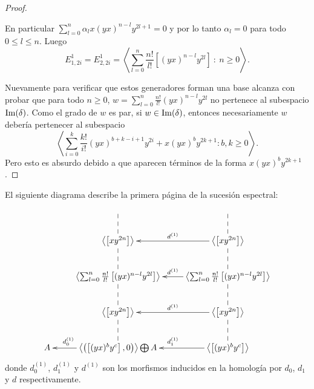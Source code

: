 \documentclass[fleqn,../tesis.tex]{subfiles}
\begin{document}
\begin{proof}
\begin{itemize}
		En particular $\sum_{l = 0}^n\alpha_lx(yx)^{n - l}y^{2l + 1} = 0$ y por lo tanto $\alpha_l = 0$ para todo $0 \leq l \leq n$.
		Luego
		\[
			E_{1,2i}^1 = E_{2, 2i}^1 = \left\langle \sum_{l = 0}^n \frac{n!}{l!}\left[(yx)^{n - l}y^{2l}\right] \ :\ n \geq 0\right\rangle.
		\]
	\end{itemize}
	Nuevamente para verificar que estos generadores forman una base alcanza con probar que para  todo $n \geq 0$,
	$w = \sum_{l = 0}^n \frac{n!}{l!}(yx)^{n - l}y^{2l}$ no pertenece al subespacio $\operatorname{Im}(\delta)$.
	Como el grado de $w$ es par, si $w \in \operatorname{Im}(\delta)$, entonces necesariamente $w$ debería pertenecer al subespacio
	\[
		\left\langle \sum_{i = 0}^k\frac{k!}{i!}(yx)^{b + k - i + 1}y^{2i} + x(yx)^by^{2k + 1} : b,k \geq 0 \right\rangle.
	\]
	Pero esto es absurdo debido a que aparecen términos de la forma $x(yx)^by^{2k + 1}$.
\end{proof}

El siguiente diagrama describe la primera página de la sucesión espectral:
\begin{align*}
\xymatrix{
	& & \\
	& \left\langle \left[xy^{2n}\right] \right\rangle \ar@{--}[u] & \left\langle \left[xy^{2n}\right] \right\rangle \ar[l]_{d^{(1)}} \ar@{--}[u]\\
	& \left\langle \sum_{l = 0}^n \frac{n!}{l!}\left[(yx)^{n - l}y^{2l}\right] \right\rangle \ar@{--}[u]
		& \left\langle \sum_{l = 0}^n \frac{n!}{l!}\left[(yx)^{n - l}y^{2l}\right] \right\rangle \ar[l]_{d^{(1)}} \ar@{--}[u]\\
	& \left\langle \left[xy^{2n}\right] \right\rangle \ar@{--}[u] & \left\langle \left[xy^{2n}\right] \right\rangle \ar[l]_{d^{(1)}} \ar@{--}[u]\\
	A & \left\langle \left(\left[(yx)^by^c\right], 0\right) \right\rangle \bigoplus A \ar[l]_(.7){d_0^{(1)}} \ar@{--}[u]
		& \left\langle \left[(yx)^by^c\right] \right\rangle \ar[l]_{d_1^{(1)}} \ar@{--}[u] \\
}
\end{align*}
donde $d_0^{(1)}$, $d_1^{(1)}$ y $d^{(1)}$ son los morfismos inducidos en la homología por $d_0$, $d_1$ y $d$ respectivamente.
\end{document}
